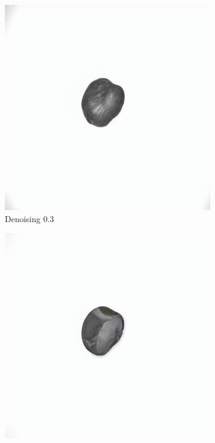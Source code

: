 \documentclass[12pt,DIV14,BCOR12mm,a4paper,footinclude=false,headinclude,parskip=half-,twoside,openright,cleardoublepage=empty,toc=index,bibliography=totoc,listof=totoc]{scrreprt}
\numberwithin{equation}{chapter}
\begin{document}
\begin{figure}
    \begin{subfigure}{0.14\textwidth}
        \centering
        \includegraphics[width=\linewidth]{../media/image_0.3.png} %
        \caption{Denoising 0.3}
    \end{subfigure}
    \begin{subfigure}{0.14\textwidth}
        \centering
        \includegraphics[width=\linewidth]{../media/image_0.5.png} %

\end{subfigure}
\end{figure}
\end{document}
